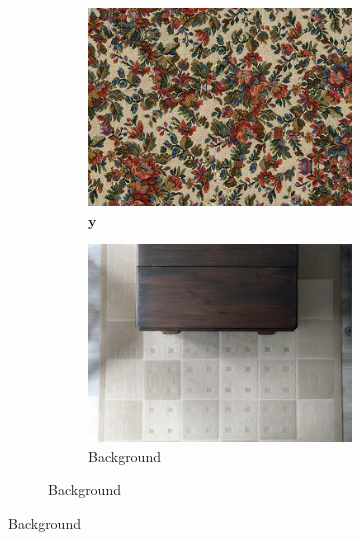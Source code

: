 \begin{figure}[]
    \centering    
    \begin{subfigure}{\textwidth}
        \centering
        \begin{subfigure}{0.24\textwidth}
            \centering
            \includegraphics[width=\textwidth]{images/04-experiment02/carpet/flowers/target.jpg}
            \caption*{\(\bm{y}\)}
        \end{subfigure}
        \hfill
        \begin{subfigure}{0.24\textwidth}
            \centering
            \includegraphics[width=\textwidth]{images/04-experiment02/carpet/bg.jpg}
            \caption*{Background}

\end{subfigure}
\end{subfigure}
\end{figure}
